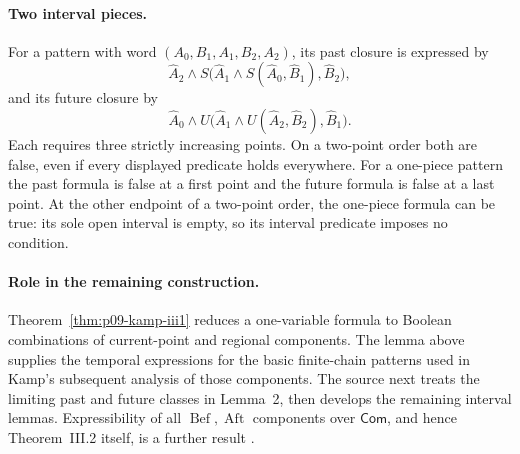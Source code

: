 \paragraph{Two interval pieces.}
For a pattern with word \((A_0,B_1,A_1,B_2,A_2)\), its past closure is
expressed by
\[
 \widehat A_2\land
 S\bigl(\widehat A_1\land S(\widehat A_0,\widehat B_1),
         \widehat B_2\bigr),
\]
and its future closure by
\[
 \widehat A_0\land
 U\bigl(\widehat A_1\land U(\widehat A_2,\widehat B_2),
         \widehat B_1\bigr).
\]
Each requires three strictly increasing points.  On a two-point order both
are false, even if every displayed predicate holds everywhere.  For a
one-piece pattern the past formula is false at a first point and the future
formula is false at a last point.  At the other endpoint of a two-point
order, the one-piece formula can be true: its sole open interval is empty,
so its interval predicate imposes no condition.

\paragraph{Role in the remaining construction.}
Theorem~\ref{thm:p09-kamp-iii1} reduces a one-variable formula to Boolean
combinations of current-point and regional components.  The lemma above
supplies the temporal expressions for the basic finite-chain patterns used
in Kamp's subsequent analysis of those components.  The source next treats
the limiting past and future classes in Lemma~2, then develops the remaining
interval lemmas.  Expressibility of all
\(\operatorname{Bef},\operatorname{Aft}\) components over
\(\mathsf{Com}\), and hence Theorem~III.2 itself, is a further result
\cite[ch.~III, pp.~60--62, 66--70]{Kamp1968}.
